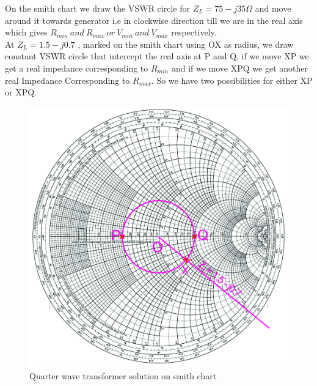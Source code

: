 \begin{example}
On the smith chart we draw the VSWR circle for $Z_{L} =75-j35\Omega$ and move around it towards generator i.e in clockwise direction till we are in the real axis which gives $R_{min}\ and\ R_{max}\ or\ V_{min}\ and\ V_{max}$ respectively. \\
At  $ \overline{Z}_L=1.5-j0.7$ , marked on the smith chart using OX as radius, we draw constant VSWR circle that intercept the real axis at P and Q, if we move XP we get a real impedance corresponding to $R_{min}$ and if we move XPQ we get another real Impedance Corresponding to $R_{max}$. So we have two possibilities for either XP or XPQ.
\begin{figure}[h]
\centering
\includegraphics[width=1\linewidth]{./graphics/tosin}
\caption{Quarter wave transformer solution on smith chart}
\end{figure}


\end{example}
